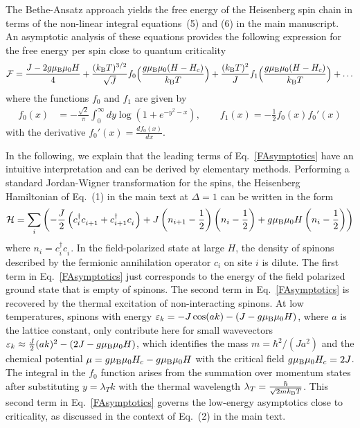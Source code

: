 \documentclass[12pt]{article}
\newcommand{\pdag}{{\phantom{\dagger}}}
\begin{document}
The Bethe-Ansatz approach yields the free energy of the Heisenberg spin chain in terms of the non-linear integral equations~(5) and (6) in the main manuscript. An asymptotic analysis of these equations provides the following expression for the free energy per spin close to quantum criticality
%
\begin{align}\label{FAsymptotics}
\mathcal{F} = \frac{J - 2 g \mu_{\rm B} \mu_0 H}{4} + \frac{(k_{\rm B} T)^{3/2}}{\sqrt{J}} f_0\Big(\frac{g\mu_{\rm B} \mu_0 (H-H_c)}{k_{\rm B} T}\Big) + \frac{(k_{\rm B} T)^2}{J} f_1\Big(\frac{g\mu_{\rm B} \mu_0 (H-H_c)}{k_{\rm B} T}\Big) + \dots
\end{align}
%
where the functions $f_0$ and $f_1$ are given by 
%
\begin{align}
f_0(x) &= - \frac{\sqrt{2}}{\pi} \int_0^\infty dy \log(1 + e^{-y^2 - x}),\qquad
f_1(x) = - \frac{1}{2} f_0(x) f_0'(x)
\end{align}
%
with the derivative $f_0'(x) = \frac{d f_0(x)}{dx}$.


In the following, we explain that the leading terms of Eq.~\eqref{FAsymptotics} have an intuitive interpretation and can be derived by elementary methods.  Performing a standard Jordan-Wigner transformation for the spins, the Heisenberg Hamiltonian of Eq.~(1) in the main text at $\Delta = 1$ can be written in the form
%
\begin{align} \label{Ham}
\mathcal{H} = \sum_i \left( - \frac{J}{2} \left(c^\dagger_i c^\pdag_{i+1} + c^\dagger_{i+1} c^\pdag_{i}\right) + J   \left(n_{i+1} - \frac{1}{2}\right) \left(n_{i} - \frac{1}{2}\right) + g \mu_{\rm B} \mu_0 H \left(n_{i} - \frac{1}{2}\right) \right)
\end{align}
%
where $n_i = c^\dagger_i c^\pdag_{i}$. 
%
In the field-polarized state at large $H$, the density of spinons described by the fermionic annihilation operator $c_i$ on site $i$ is dilute. The first term in Eq.~\eqref{FAsymptotics} just corresponds to the energy of the field polarized ground state that is empty of spinons. The second term in Eq.~\eqref{FAsymptotics} is recovered by the thermal excitation of non-interacting spinons. At low temperatures, spinons with energy $\varepsilon_k = - J \cos (a k) - (J - g\mu_{\rm B} \mu_0 H)$, where $a$ is the lattice constant, only contribute here  for small wavevectors $\varepsilon_k \approx \frac{J}{2} (a k)^2 - (2J - g\mu_{\rm B} \mu_0 H)$, which identifies the mass $m = \hbar^2/(J a^2)$ and the chemical potential $\mu = g\mu_{\rm B} \mu_0 H_c - g\mu_{\rm B} \mu_0 H$ with the critical field $g\mu_{\rm B} \mu_0 H_c = 2 J$. The integral in the $f_0$ function arises from the summation over momentum states after substituting $y = \lambda_T k$ with the thermal wavelength $\lambda_T = \frac{\hbar}{\sqrt{2 m k_{\rm B} T}}$. This second term in Eq.~\eqref{FAsymptotics} governs the low-energy asymptotics close to criticality, as discussed in the context of Eq.~(2) in the main text. 
\end{document}
